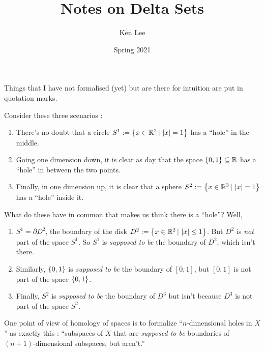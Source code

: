 \documentclass{article}
\begin{document}
\title{Notes on Delta Sets}

\author{Ken Lee}
\date{Spring 2021}
\maketitle


Things that I have not formalised (yet) but are there for intuition
are put in quotation marks.

\begin{rmk}

  Consider these three scenarios : 
  \begin{enumerate}
    \item There's no doubt that a circle 
    $S^1 := \left\{x \in \mathbb{R}^2 \,|\, \left\vert x \right\vert = 1\right\}$
    has a ``hole'' in the middle.
    \item Going one dimension down, 
    it is clear as day that the space $\left\{0,1\right\} \subseteq \mathbb{R}$ has a ``hole''
    in between the two points.
    \item Finally, in one dimension up, 
    it is clear that a sphere $S^2 := \left\{x \in \mathbb{R}^3 \,|\, \left\vert x \right\vert = 1\right\}$
    has a ``hole'' inside it. 
  \end{enumerate}
  What do these have in common that makes us think 
  there is a ``hole''?
  Well, 
  \begin{enumerate}
    \item $S^1 = \partial D^2$, 
    the boundary of the disk $D^2 := \left\{x \in \mathbb{R}^2 \,|\, \left\vert x \right\vert \leq 1\right\}$.
    But $D^2$ is \emph{not} part of the space $S^1$.
    So $S^1$ is \emph{supposed to be} the boundary of $D^2$,
    which isn't there.
    \item 
    Similarly, $\left\{0,1\right\}$ is \emph{supposed to be} the boundary of $[0,1]$,
    but $[0,1]$ is not part of the space $\left\{0,1\right\}$.
    \item Finally, $S^2$ is \emph{supposed to be}
    the boundary of $D^3$ but isn't because $D^3$ is not part of the space 
    $S^2$.
  \end{enumerate}
  One point of view of homology of spaces is 
  to formalize ``$n$-dimensional holes in $X$'' as exactly this : 
  ``subspaces of $X$ that are \emph{supposed to be} boundaries of 
  $(n+1)$-dimensional subspaces, but aren't.''


\end{rmk}
\end{document}
